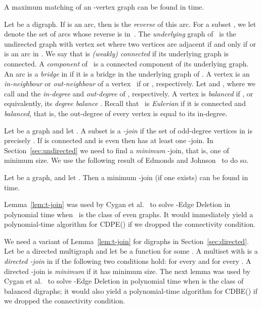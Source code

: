 \documentclass[11pt]{llncs}
\newcommand{\cdpe}{{\sc CDPE}}
\newcommand{\cdbe}{{\sc CDBE}}
\begin{document}
\begin{lemma}\label{l-mic}
A maximum matching of an -vertex graph can be found in  
time.
\end{lemma}

Let  be a digraph.  If  is an arc, then  is the {\em
reverse} of this arc.  For a subset , we let  denote the set of arcs whose reverse is in~.  The \emph{underlying}
graph of~ is the undirected graph with vertex set  where two vertices
 are adjacent if and only if  or  is an arc in .  We
say that  is \emph{(weakly) connected} if its underlying graph is connected.
A {\em component} of~ is a connected component of its underlying graph.  An
arc  is a \emph{bridge} in  if it is a bridge in the underlying
graph of .  A vertex  is an \emph{in-neighbour} or \emph{out-neighbour}
of a vertex~ if  or , respectively. Let
 and , where we
call  and  the \emph{in-degree} and
\emph{out-degree} of , respectively. 
A vertex  is {\em balanced} if , 
or equivalently, its {\em degree balance} .
Recall that~ is {\em Eulerian} if it
is connected and {\em balanced}, that is, the out-degree of every vertex is
equal to its in-degree. 

Let  be a graph and let . A subset  is a
\emph{-join} if the set of odd-degree vertices in  is precisely .
If  is connected and  is even then  has at least one -join. In
Section~\ref{sec:undirected} we need to find a {\em minimum} -join, that is,
one of minimum size. We use the following result of Edmonds and Johnson~\cite{EdmondsJ73} to do
so.

\begin{lemma}\label{lem:t-join}
Let  be  a graph, and let .  Then a minimum -join (if
one exists) can be found in  time. 
\end{lemma}
Lemma~\ref{lem:t-join} was used by Cygan et al.~\cite{CyganMPPS14} to solve
-{\sc Edge Deletion} in polynomial time when~ is the class
of even graphs. It would  immediately yield a polynomial-time algorithm for
\cdpe() if we dropped the connectivity condition.

We need a variant of Lemma~\ref{lem:t-join} for digraphs in
Section~\ref{sec:directed}.  Let  be a directed multigraph and let  be a function for some .  A multiset
 with  is a {\em directed -join} in 
if the following two conditions hold: 
 for
every  and  for every .  A directed -join is {\em minimum} if it has minimum
size.  The next lemma was used by Cygan et al.~\cite{CyganMPPS14} to solve
-{\sc Edge Deletion} in polynomial time when  is the class
of balanced digraphs; it would also yield a polynomial-time algorithm for
\cdbe() if we dropped the connectivity condition. 
\end{document}
